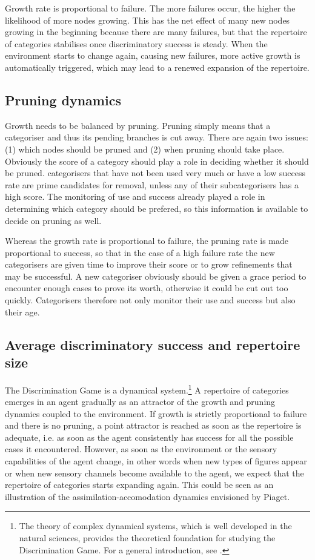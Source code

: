 Growth rate is proportional to failure. The more failures 
occur, the higher the likelihood of more nodes growing. This has the 
net effect of many new nodes growing in the beginning because
there are many failures, but that the repertoire of
categories stabilises
once discriminatory success is steady. When the environment 
starts to change again, causing new failures, more active 
growth is automatically triggered, which may lead 
to a renewed expansion of the repertoire. 

\subsection{Pruning dynamics}

Growth needs to be balanced by pruning. Pruning simply means
that a categoriser and thus its pending branches is 
cut away. There are again two
issues: (1) which nodes should be pruned and
(2) when pruning should take place. 
Obviously the score of a category should play a role
in deciding whether it should be pruned. 
categorisers that have not been used very much or have a low
success rate are prime candidates for removal, unless
any of their subcategorisers has a high score. The 
monitoring of use and success already played a role in 
determining which category should be prefered, so this
information is available to decide on pruning as well. 

Whereas the growth rate is proportional to failure, the pruning
rate is made proportional to success, so that 
in the case of a high failure rate the new categorisers are given
time to improve their score or to grow refinements that may be 
successful. A new categoriser obviously should be given
a grace period to encounter enough cases to prove
its worth, otherwise it could be cut out too quickly. Categorisers 
therefore not only monitor their use and success but 
also their age. 

\subsection{Average discriminatory success and repertoire size}

The Discrimination Game is a dynamical system.\footnote{
The theory of complex dynamical systems, which is well 
developed in the natural sciences, provides the 
theoretical foundation for studying the Discrimination
Game. For a general introduction, see \cite{Peitgen:1992}.} A repertoire of
categories emerges in an agent gradually as an attractor of the
growth and pruning dynamics coupled to 
the environment. If growth is strictly proportional to failure
and there is no pruning, a point attractor
is reached as soon as the repertoire
is adequate, i.e. as soon 
as the agent consistently has success
for all the possible cases it encountered. However, 
as soon as the environment or the sensory capabilities of 
the agent change, in other words when new types of 
figures appear or when new sensory channels become available
to the agent, we expect that the repertoire of categories starts
expanding again. This could be seen as an illustration  of the
assimilation-accomodation dynamics envisioned by Piaget. 

